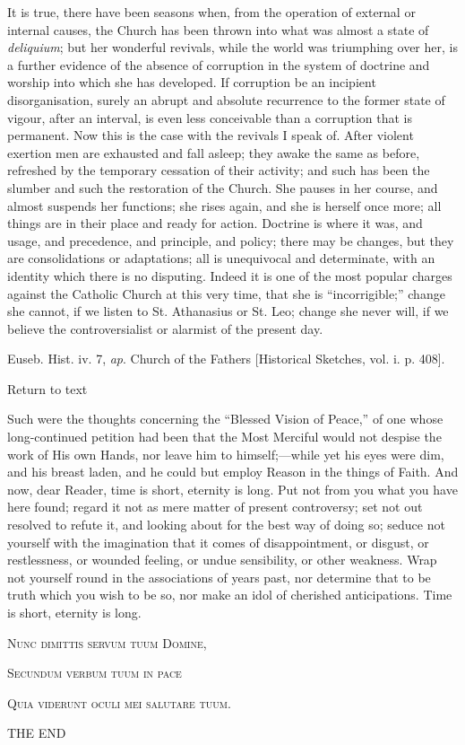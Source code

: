 It is true, there have been seasons when, from the operation of
external or internal causes, the Church has been thrown into what was
almost a state of \emph{deliquium}; but her wonderful revivals, while
the world was triumphing over her, is a further evidence of the
absence of corruption in the system of doctrine and worship into which
she has developed. If corruption be an incipient disorganisation,
surely an abrupt and absolute recurrence to the former state of vigour,
after an interval, is even less conceivable than a corruption that is
permanent. Now this is the case with the revivals I speak of. After
violent exertion men are exhausted and fall asleep; they awake the
same as before, refreshed by the temporary cessation of their
activity; and such has been the slumber and such the restoration of
the Church. She pauses in her course, and almost suspends her
functions; she rises again, and she is herself once more; all things
are in their place and ready for action. Doctrine is where it was, and
usage, and precedence, and principle, and policy; there may be
changes, but they are consolidations or adaptations; all is
unequivocal and determinate, with an identity which there is no
disputing. Indeed it is one of the most popular charges against the
Catholic Church at this very time, that she is
``incorrigible;'' change she cannot, if we listen to St.
Athanasius or St. Leo; change she never will, if we believe the
controversialist or alarmist of the present day.


Euseb. Hist. iv. 7, \emph{ap}. Church of the Fathers [Historical
Sketches, vol. i. p. 408].

Return to text

\devsection{[Conclusion]}

Such were the thoughts concerning the ``Blessed Vision of
Peace,'' of one whose long-continued petition had been that the
Most Merciful would not despise the work of His own Hands, nor leave
him to himself;—while yet his eyes were dim, and his breast laden,
and he could but employ Reason in the things of Faith. And now, dear
Reader, time is short, eternity is long. Put not from you what you
have here found; regard it not as mere matter of present controversy;
set not out resolved to refute it, and looking about for the best way
of doing so; seduce not yourself with the imagination that it comes of
disappointment, or disgust, or restlessness, or wounded feeling, or
undue sensibility, or other weakness. Wrap not yourself round in the
associations of years past, nor determine that to be truth which you
wish to be so, nor make an idol of cherished anticipations. Time is
short, eternity is long.

\textsc{Nunc
dimittis servum tuum Domine,}

\textsc{Secundum
verbum tuum in pace}

\textsc{Quia
viderunt oculi mei salutare tuum.}

THE END
